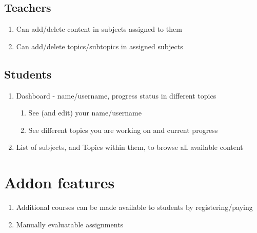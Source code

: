 \documentclass{article}
\begin{document}
    \subsection{Teachers}
    \begin{enumerate}
        \item Can add/delete content in subjects assigned to them
        \item Can add/delete topics/subtopics in assigned subjects
    \end{enumerate}

    \subsection{Students}
    \begin{enumerate}
        \item Dashboard - name/username, progress status in different topics
            \begin{enumerate}
                \item See (and edit) your name/username
                \item See different topics you are working on and current progress
            \end{enumerate}
        \item List of subjects, and Topics within them, to browse all available content
    \end{enumerate}

\section{Addon features}

\begin{enumerate}
    \item Additional courses can be made available to students by registering/paying
    \item Manually evaluatable assignments
\end{enumerate}
\end{document}
